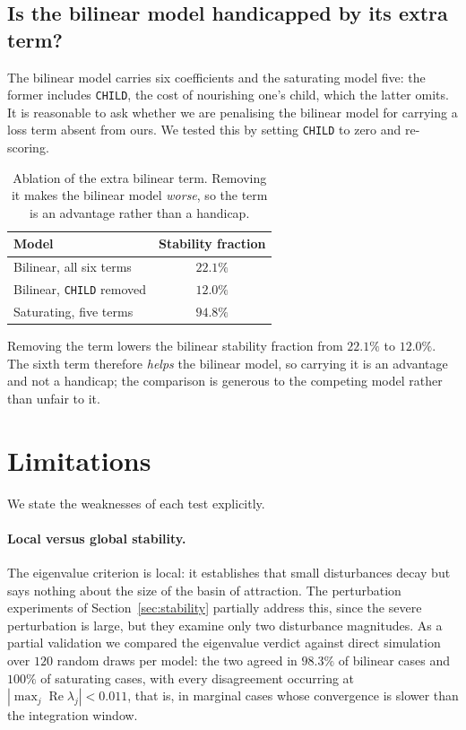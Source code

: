 \documentclass[11pt]{article}
\begin{document}
\subsection{Is the bilinear model handicapped by its extra term?}

The bilinear model carries six coefficients and the saturating model five: the
former includes \texttt{CHILD}, the cost of nourishing one's child, which the
latter omits. It is reasonable to ask whether we are penalising the bilinear
model for carrying a loss term absent from ours. We tested this by setting
\texttt{CHILD} to zero and re-scoring.

\begin{table}[!htb]
\centering
\begin{tabular}{lc}
\toprule
Model & Stability fraction \\
\midrule
Bilinear, all six terms       & $22.1\%$ \\
Bilinear, \texttt{CHILD} removed & $12.0\%$ \\
Saturating, five terms        & $94.8\%$ \\
\bottomrule
\end{tabular}
\caption{Ablation of the extra bilinear term. Removing it makes the bilinear
model \emph{worse}, so the term is an advantage rather than a handicap.}
\label{tab:ablation}
\end{table}

Removing the term lowers the bilinear stability fraction from $22.1\%$ to
$12.0\%$. The sixth term therefore \emph{helps} the bilinear model, so carrying
it is an advantage and not a handicap; the comparison is generous to the
competing model rather than unfair to it.

\section{Limitations}\label{sec:limits}

We state the weaknesses of each test explicitly.

\paragraph{Local versus global stability.}
The eigenvalue criterion is local: it establishes that small disturbances decay
but says nothing about the size of the basin of attraction. The perturbation
experiments of Section~\ref{sec:stability} partially address this, since the
severe perturbation is large, but they examine only two disturbance magnitudes.
As a partial validation we compared the eigenvalue verdict against direct
simulation over $120$ random draws per model: the two agreed in $98.3\%$ of
bilinear cases and $100\%$ of saturating cases, with every disagreement occurring
at $|\max_j\operatorname{Re}\lambda_j|<0.011$, that is, in marginal cases whose
convergence is slower than the integration window.
\end{document}
